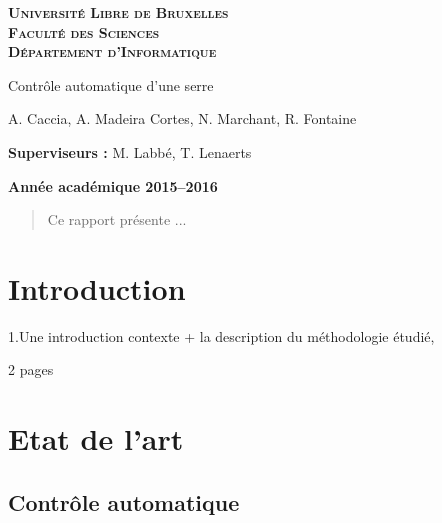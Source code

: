 \documentclass[a4paper,10pt]{report}
\begin{document}
\begin{titlepage}
    \begin{center}
        \textbf{\textsc{Université Libre de Bruxelles}}\\
        \textbf{\textsc{Faculté des Sciences}}\\
        \textbf{\textsc{Département d'Informatique}}

        \vfill{}
        \vfill{}

        \begin{center}
            {\Huge Contrôle automatique d'une serre}
        \end{center}

        {\Huge \par}

        \begin{center}
            {\large A. Caccia, A. Madeira Cortes, N. Marchant, R. Fontaine}
        \end{center}

        {\Huge \par}
        \vfill{}
        \vfill{}

        \begin{flushleft}
            {\large \textbf{Superviseurs :} M. Labbé, T. Lenaerts}
            \hfill{}
        \end{flushleft}

        {\large\par}
        \vfill{}
        \vfill{}

        \textbf{Année académique 2015--2016}
    \end{center}
\end{titlepage}

\begin{abstract}
Ce rapport présente ...
\end{abstract}


\tableofcontents


\chapter{Introduction}
1.Une introduction contexte + la description du méthodologie étudié,

2 pages

\chapter{Etat de l'art}
\section{Contrôle automatique}
\end{document}

